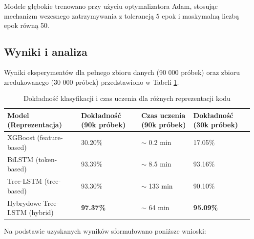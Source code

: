 \documentclass[conference]{IEEEtran}
\begin{document}
Modele głębokie trenowano przy użyciu optymalizatora Adam, stosując mechanizm wczesnego 
zatrzymywania z tolerancją 5 epok i maskymalną liczbą epok równą 50.

\subsection{Wyniki i analiza}

Wyniki eksperymentów dla pełnego zbioru danych (90 000 próbek) oraz zbioru zredukowanego (30 000 próbek) przedstawiono w Tabeli \ref{tab:wyniki}.

\begin{table}[htbp]
\centering
\caption{Dokładność klasyfikacji i czas uczenia dla różnych reprezentacji kodu}
\label{tab:wyniki}
\renewcommand{\arraystretch}{1.4} 
\begin{tabular}{|p{2.0cm}|p{1.6cm}|p{1.6cm}|p{1.6cm}|}
\hline
\textbf{Model (Reprezentacja)} & \textbf{Dokładność (90k próbek)} & \textbf{Czas uczenia (90k próbek)} & \textbf{Dokładność (30k próbek)} \\
\hline
XGBoost (feature-based) & 30.20\% & $\sim$ 0.2 min & 17.05\% \\
\hline
BiLSTM (token-based) & 93.39\% & $\sim$ 8.5 min & 93.16\% \\
\hline
Tree-LSTM (tree-based) & 93.30\% & $\sim$ 133 min & 90.10\% \\
\hline
Hybrydowe Tree-LSTM (hybrid) & \textbf{97.37\%} & $\sim$ 64 min & \textbf{95.09\%} \\
\hline
\end{tabular}
\end{table}

Na podstawie uzyskanych wyników sformułowano poniższe wnioski:
\end{document}
